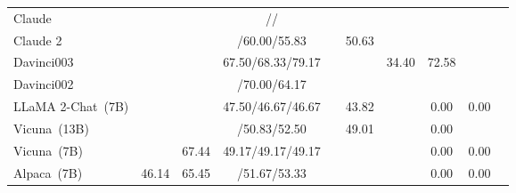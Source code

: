 \begin{table*}[htb]
{\begin{tabular}{lccccccccc}
Claude & \cellcolor[HTML]{FEDCCC}{67.93} & \cellcolor[HTML]{FEF7F3}{32.73} & \cellcolor[HTML]{FEE8DD}{71.67}/\cellcolor[HTML]{FEE8DD}{55.00}/\cellcolor[HTML]{FEE8DD}{52.50} & \cellcolor[HTML]{FEDCCC}{3.75} & \cellcolor[HTML]{FCA77F}{63.75}  & \cellcolor[HTML]{FEDCCC}{33.80} & \cellcolor[HTML]{FEE8DD}{22.04} & \cellcolor[HTML]{FEDCCC}{7.74} & \cellcolor[HTML]{FEDCCC}{7.08}\\
Claude 2 & \cellcolor[HTML]{FC8D59}{71.11} & \cellcolor[HTML]{FEDCCC}{10.67} & \cellcolor[HTML]{FEF7F3}{60.00}/60.00/55.83 & \cellcolor[HTML]{FCA77F}{3.20} & \cellcolor[HTML]{FEF7F3}50.63 & \cellcolor[HTML]{FC8D59}{36.4} & \cellcolor[HTML]{FEDCCC}{61.29} & \cellcolor[HTML]{FCA77F}{22.19} & \cellcolor[HTML]{FC8D59}{23.67} \\
Davinci003 & \cellcolor[HTML]{FEE8DD}{60.83} & \cellcolor[HTML]{FC8D59}{0.99} & \cellcolor[HTML]{FC8D59}67.50/68.33/{79.17} & \cellcolor[HTML]{FEE8DD}{8.81} & \cellcolor[HTML]{FEE8DD}{58.94}  & \cellcolor[HTML]{FCA77F}
{34.40} & \cellcolor[HTML]{FC8D59}
{72.58} & \cellcolor[HTML]{FEE8DD}{3.80} & \cellcolor[HTML]{FEE8DD}{6.42}\\
Davinci002 & \cellcolor[HTML]{FEF7F3}{53.73} & \cellcolor[HTML]{FCA77F}{7.56} & \cellcolor[HTML]{FEDCCC}{72.50}/70.00/64.17 & \cellcolor[HTML]{FEF7F3}{10.65} & \cellcolor[HTML]{FEDCCC}{59.67}  & \cellcolor[HTML]{FEE8DD}{26.00} & \cellcolor[HTML]{FEF7F3}{2.69} & \cellcolor[HTML]{FEF7F3}{1.02} & \cellcolor[HTML]{FEF7F3}{1.00}\\
\midrule
LLaMA 2-Chat~(7B) & \cellcolor[HTML]{92BFDB}{69.77} & \cellcolor[HTML]{A7CBE2}{48.54} & 47.50/46.67/46.67 & \cellcolor[HTML]{A7CBE2}{4.61} & \cellcolor[HTML]{C6DEED}43.82 & \cellcolor[HTML]{C4DDEC}{4.40} & 0.00 & 0.00 & \cellcolor[HTML]{C6DEED}{0.22} \\
Vicuna~(13B) & \cellcolor[HTML]{C6DEED}{62.30} & \cellcolor[HTML]{92BFDB}{45.95} & \cellcolor[HTML]{C6DEED}{50.83}/50.83/52.50 & \cellcolor[HTML]{E5F0F7}{5.00} & \cellcolor[HTML]{92BFDB}49.01 & \cellcolor[HTML]{A7CBE2}{11.20} & 0.00 & \cellcolor[HTML]{92BFDB}{0.44} & \cellcolor[HTML]{92BFDB}{0.89} \\
Vicuna~(7B) & \cellcolor[HTML]{C4DDEC}{57.77} & {67.44} & 49.17/49.17/49.17 & \cellcolor[HTML]{C6DEED}{4.70} & \cellcolor[HTML]{C4DDEC}{43.44} & \cellcolor[HTML]{C6DEED}{6.20} & {0.00} & {0.00} & \cellcolor[HTML]{A7CBE2}{0.33}\\
Alpaca~(7B) & {46.14} & {65.45} & \cellcolor[HTML]{A7CBE2}{53.33}/51.67/{53.33} & \cellcolor[HTML]{C4DDEC}{4.78} & \cellcolor[HTML]{A7CBE2}{44.16}  & \cellcolor[HTML]{92BFDB}{11.60} & {0.00} & {0.00} & \cellcolor[HTML]{C4DDEC}{0.11}\\

\end{tabular}}
\end{table*}
